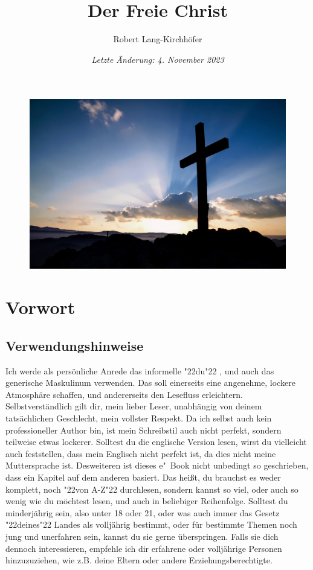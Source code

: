 \documentclass[10pt,a5paper]{article}
\title{\textbf{Der Freie Christ}}
\author{Robert Lang-Kirchh\"ofer}
\date{\textit{Letzte \"Anderung: 4. November 2023}}
\newcommand{\q}[1]{\char"22{#1}\char"22 }
\begin{document}
	\setlength{\parindent}{0mm}
	\maketitle
	\begin{figure}[h]
		\centering
		\includegraphics[width=1\textwidth,keepaspectratio]{"FreeChristian.jpeg"}
	\end{figure}

	\newpage
	\pagecolor{white}
	\tableofcontents
	
	\newpage
	\section{Vorwort}

	\subsection{Verwendungshinweise}
		Ich werde als pers\"onliche Anrede das informelle \q{du},
		und auch das generische Maskulinum verwenden.
		Das soll einerseits eine angenehme,
		lockere Atmosph\"are schaffen,
		und andererseits den Lesefluss erleichtern.
		Selbstverst\"andlich gilt dir,
		mein lieber Leser,
		unabh\"angig von deinem tats\"achlichen Geschlecht,
		mein vollster Respekt.
		Da ich selbst auch kein professioneller Author bin,
		ist mein Schreibstil auch nicht perfekt,
		sondern teilweise etwas lockerer.
		Solltest du die englische Version lesen,
		wirst du vielleicht auch feststellen,
		dass mein Englisch nicht perfekt ist,
		da dies nicht meine Muttersprache ist.
		Desweiteren ist dieses e"~Book nicht unbedingt so geschrieben,
		dass ein Kapitel auf dem anderen basiert.
		Das hei{\ss}t,
		du brauchst es weder komplett,
		noch \q{von A-Z} durchlesen,
		sondern kannst so viel,
		oder auch so wenig wie du m\"ochtest lesen,
		und auch in beliebiger Reihenfolge.
		Solltest du minderj\"ahrig sein,
		also unter 18 oder 21,
		oder was auch immer das Gesetz \q{deines} Landes als vollj\"ahrig bestimmt,
		oder f\"ur bestimmte Themen noch jung und unerfahren sein,
		kannst du sie gerne \"uberspringen.
		Falls sie dich dennoch interessieren,
		empfehle ich dir erfahrene oder vollj\"ahrige Personen hinzuzuziehen,
		wie z.B. deine Eltern oder andere Erziehungsberechtigte.
\end{document}
